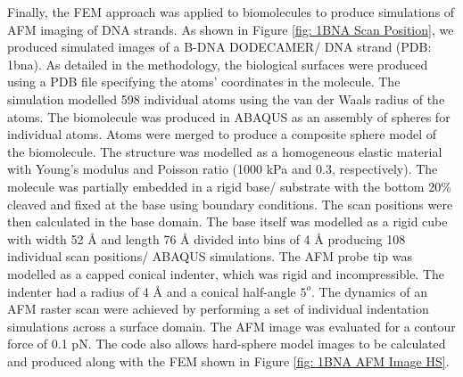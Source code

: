 Finally, the FEM approach was applied to biomolecules to produce simulations of AFM imaging of DNA strands. As shown in Figure \ref{fig: 1BNA Scan Position}, we produced simulated images of a B-DNA DODECAMER/ DNA strand (PDB: 1bna). As detailed in the methodology, the biological surfaces were produced using a PDB file specifying the atoms' coordinates in the molecule. The simulation modelled 598 individual atoms using the van der Waals radius of the atoms. The biomolecule was produced in ABAQUS as an assembly of spheres for individual atoms. Atoms were merged to produce a composite sphere model of the biomolecule. The structure was modelled as a homogeneous elastic material with Young's modulus and Poisson ratio (1000 kPa and 0.3, respectively). The molecule was partially embedded in a rigid base/ substrate with the bottom 20\% cleaved and fixed at the base using boundary conditions. The scan positions were then calculated in the base domain. The base itself was modelled as a rigid cube with width 52 $\text{\AA}$ and length 76 $\text{\AA}$ divided into bins of 4 $\text{\AA}$ producing 108 individual scan positions/ ABAQUS simulations. The AFM probe tip was modelled as a capped conical indenter, which was rigid and incompressible. The indenter had a radius of 4 $\text{\AA}$ and a conical half-angle $5^{o}$. The dynamics of an AFM raster scan were achieved by performing a set of individual indentation simulations across a surface domain. The AFM image was evaluated for a contour force of 0.1 pN. The code also allows hard-sphere model images to be calculated and produced along with the FEM shown in Figure \ref{fig: 1BNA AFM Image HS}.


